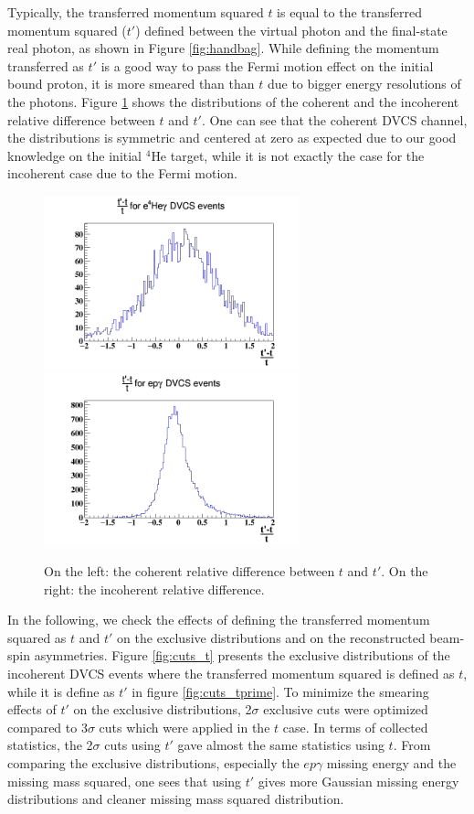 Typically, the transferred momentum squared $t$ is equal to the transferred 
momentum squared ($t'$) defined between the virtual photon and the final-state 
real photon, as shown in Figure \ref{fig:handbag}.  While defining the momentum 
transferred as $t'$ is a good way to pass the Fermi motion effect on the 
initial bound proton, it is more smeared than than $t$ due to bigger energy 
resolutions of the photons. Figure \ref{fig:tprime} shows the distributions of 
the coherent and the incoherent relative difference between $t$ and $t'$. One 
can see that the coherent DVCS channel, the distributions is symmetric and 
centered at zero as expected due to our good knowledge on the initial $^4$He 
target, while it is not exactly the case for the incoherent case due to the 
Fermi motion.\\            

\begin{figure}[h!]
\includegraphics[height=5.0cm]{fig-incoh/T_tprime_Coh.png}
\includegraphics[height=5.0cm]{fig-incoh/T_tprime_InCoh.png}
\caption{On the left: the coherent relative difference between $t$ and $t'$.  
On the right: the incoherent relative difference.}
\label{fig:tprime}
\end{figure}

In the following, we check the effects of defining the transferred momentum 
squared as $t$ and $t'$ on the exclusive distributions and on the reconstructed 
beam-spin asymmetries. Figure \ref{fig:cuts_t} presents the exclusive 
distributions of the incoherent DVCS events where the transferred momentum
squared is defined as $t$, while it is define as $t'$ in figure 
\ref{fig:cuts_tprime}. To minimize the smearing effects of $t'$ on the 
exclusive distributions, 2$\sigma$ exclusive cuts were optimized compared to 
3$\sigma$ cuts which were applied in the $t$ case. In terms of collected 
statistics, the 2$\sigma$ cuts using $t'$ gave almost the same statistics using 
$t$. From comparing the exclusive distributions, especially the $ep\gamma$ 
missing energy and the missing mass squared, one sees that using $t'$ gives 
more Gaussian missing energy distributions and cleaner missing mass squared 
distribution.\\      

